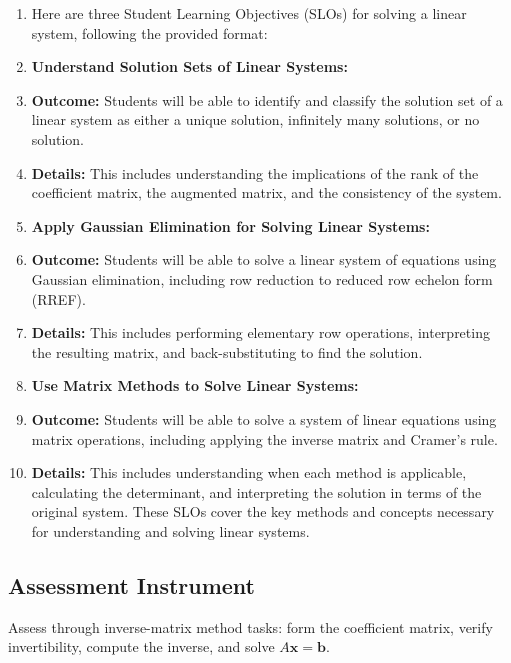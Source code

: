 \begin{enumerate}
    \item Here are three Student Learning Objectives (SLOs) for solving a linear system, following the provided format:
    \item \textbf{Understand Solution Sets of Linear Systems:}
    \item \textbf{Outcome:} Students will be able to identify and classify the solution set of a linear system as either a unique solution, infinitely many solutions, or no solution.
    \item \textbf{Details:} This includes understanding the implications of the rank of the coefficient matrix, the augmented matrix, and the consistency of the system.
    \item \textbf{Apply Gaussian Elimination for Solving Linear Systems:}
    \item \textbf{Outcome:} Students will be able to solve a linear system of equations using Gaussian elimination, including row reduction to reduced row echelon form (RREF).
    \item \textbf{Details:} This includes performing elementary row operations, interpreting the resulting matrix, and back-substituting to find the solution.
    \item \textbf{Use Matrix Methods to Solve Linear Systems:}
    \item \textbf{Outcome:} Students will be able to solve a system of linear equations using matrix operations, including applying the inverse matrix and Cramer’s rule.
    \item \textbf{Details:} This includes understanding when each method is applicable, calculating the determinant, and interpreting the solution in terms of the original system. These SLOs cover the key methods and concepts necessary for understanding and solving linear systems.
\end{enumerate}


\subsection{Assessment Instrument}
\label{ssec:asse-3669}


Assess through inverse-matrix method tasks: form the coefficient matrix,
verify invertibility, compute the inverse, and solve $A\mathbf{x}=\mathbf{b}$.


